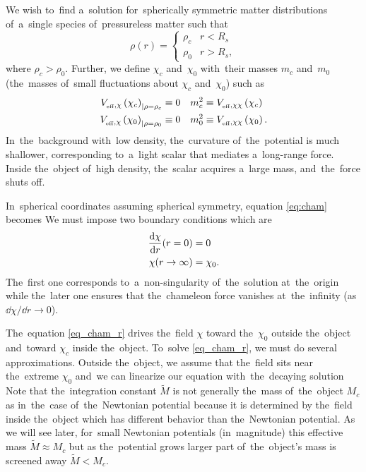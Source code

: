 We wish to~find a~solution for~spherically symmetric matter distributions of~a~single species of~pressureless matter such that
\begin{equation*}
\rho(r)=
\begin{cases}
\rho_c & r<R_s \\
\rho_0 & r>R_s,
\end{cases}
\end{equation*}
where $\rho_c>\rho_0$. Further, we define $\chi_c$ and~$\chi_0$ with~their masses $m_c$ and~$m_0$ (the~masses of~small fluctuations about $\chi_c$ and~$\chi_0$) such as
\begin{align*}
V_{_\text{\tiny eff},\chi}\left(\chi_c\right)_{|\rho=\rho_c}&\equiv0	&	m^2_c&\equiv V_{_\text{\tiny eff},\chi\chi}\left(\chi_c\right) \\
V_{_\text{\tiny eff},\chi}\left(\chi_0\right)_{|\rho=\rho_0}&\equiv0	&	m^2_0&\equiv V_{_\text{\tiny eff},\chi\chi}\left(\chi_0\right).
\end{align*}
In~the~background with~low density, the~curvature of~the~potential is much shallower, corresponding to~a~light scalar that mediates a~long-range force. Inside the~object of~high density, the~scalar acquires a~large mass, and~the~force shuts off.

In~spherical coordinates assuming spherical symmetry, equation \eqref{eq:cham} becomes
We must impose two boundary conditions which are
\begin{align*}
\frac{\mbox{d} \chi}{\mbox{d} r}(r=0)&=0 \\
\chi(r\rightarrow\infty)&=\chi_0.
\end{align*}
The~first one corresponds to~a~non-singularity of~the~solution at~the~origin while the~later one ensures that the~chameleon force vanishes at~the~infinity (as $\dd\chi/\dd r\rightarrow0$).

The~equation \eqref{eq_cham_r} drives the~field $\chi$ toward the~$\chi_0$ outside the~object and~toward $\chi_c$ inside the~object. To~solve \eqref{eq_cham_r}, we must do several approximations. Outside the~object, we assume that the~field sits near the~extreme $\chi_0$ and~we can linearize our equation
with~the~decaying solution
Note that the~integration constant $\tilde{M}$ is not generally the~mass of~the~object $M_c$ as in~the~case of~the~Newtonian potential because it is determined by the~field inside the~object which has different behavior than the~Newtonian potential. As we will see later, for~small Newtonian potentials (in~magnitude) this effective mass $\tilde{M}\approx M_c$ but as the~potential grows larger part of~the~object's mass is screened away $\tilde{M}< M_c$.

